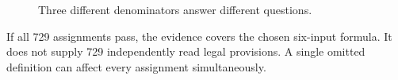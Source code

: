 \begin{figure}[H]
\centering
{}
\caption{Three different denominators answer different questions.}\label{fig:teach-M01-01}
\end{figure}

If all 729 assignments pass, the evidence covers the chosen six-input formula. It does not supply 729 independently read legal provisions. A single omitted definition can affect every assignment simultaneously.

